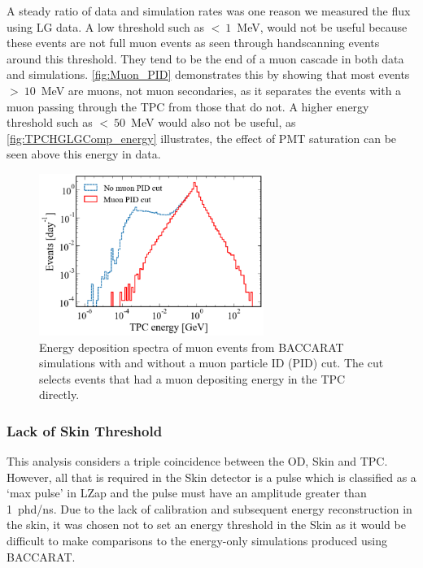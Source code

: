 A steady ratio of data and simulation rates was one reason we measured the flux using LG data. A low threshold such as $<~1$~MeV, would not be useful because these events are not full muon events as seen through handscanning events around this threshold. They tend to be the end of a muon cascade in both data and simulations. \autoref{fig:Muon_PID} demonstrates this by showing that most events $>~10$~MeV are muons, not muon secondaries, as it separates the events with a muon passing through the TPC from those that do not. A higher energy threshold such as $<~50$~MeV would also not be useful, as \autoref{fig:TPCHGLGComp_energy} illustrates, the effect of PMT saturation can be seen above this energy in data.
\begin{figure}[htbp]
    \centering
    \includegraphics[width=0.65\textwidth]{figures/Muons/Muon_pid_cutLZstyle.pdf}
    \caption{Energy deposition spectra of muon events from BACCARAT simulations with and without a muon particle ID (PID) cut. The cut selects events that had a muon depositing energy in the TPC directly.}
    \label{fig:Muon_PID}
\end{figure}

\subsubsection{Lack of Skin Threshold}
This analysis considers a triple coincidence between the OD, Skin and TPC. However, all that is required in the Skin detector is a pulse which is classified as a `max pulse' in LZap and the pulse must have an amplitude greater than 1~phd/ns. Due to the lack of calibration and subsequent energy reconstruction in the skin, it was chosen not to set an energy threshold in the Skin as it would be difficult to make comparisons to the energy-only simulations produced using BACCARAT.

